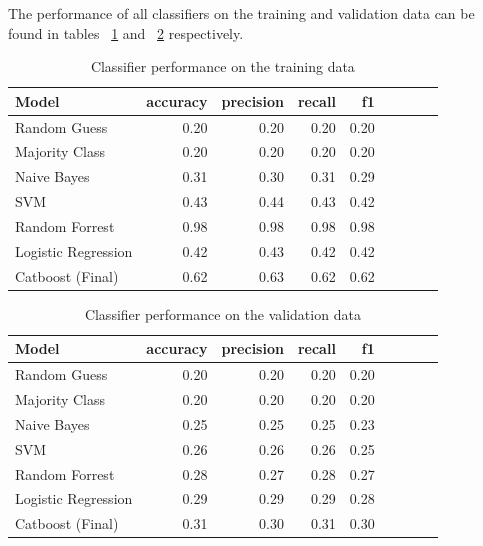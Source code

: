 \documentclass{article}
\begin{document}
	The performance of all classifiers on the training and validation data can be found in tables ~\ref{table:results_train} and ~\ref{table:results_valid} respectively.

	\begin{table}[h!]
		\centering
		\caption{Classifier performance on the training data}
		\label{table:results_train}
		
		\begin{tabular}{lrrrrrrrr}
			\toprule
			Model &     accuracy &     precision &     recall &    f1 \\
			\midrule
			Random Guess   &  0.20 &  0.20 &   0.20 &  0.20 \\
			Majority Class &    0.20 &  0.20 &   0.20 &   0.20 \\
			Naive Bayes       &   0.31 & 0.30 &  0.31 &  0.29 \\
			SVM      &  0.43 & 0.44 & 0.43 &  0.42 \\
			Random Forrest      &  0.98 & 0.98 & 0.98 &  0.98 \\
			Logistic Regression   &  0.42 & 0.43 & 0.42 &  0.42 \\
			Catboost (Final)   &  0.62 & 0.63 &  0.62 & 0.62 \\
			\bottomrule
		\end{tabular}
		
	\end{table}%

	\begin{table}[h!]
		\centering
		\caption{Classifier performance on the validation data}
		\label{table:results_valid}
		
		\begin{tabular}{lrrrrrrrr}
			\toprule
			Model &     accuracy &     precision &     recall &    f1 \\
			\midrule
			Random Guess   &  0.20 &  0.20 &   0.20 &  0.20 \\
			Majority Class &    0.20 &  0.20 &   0.20 &   0.20 \\
			Naive Bayes       &   0.25 & 0.25 &  0.25 &  0.23 \\
			SVM      &  0.26 & 0.26 & 0.26 & 0.25 \\
			Random Forrest      &  0.28 & 0.27 & 0.28 & 0.27 \\
			Logistic Regression   &  0.29 & 0.29 &  0.29 &  0.28 \\
			Catboost (Final)   &  0.31 & 0.30 &  0.31 & 0.30 \\
			\bottomrule
		\end{tabular}
		
	\end{table}%
\end{document}
